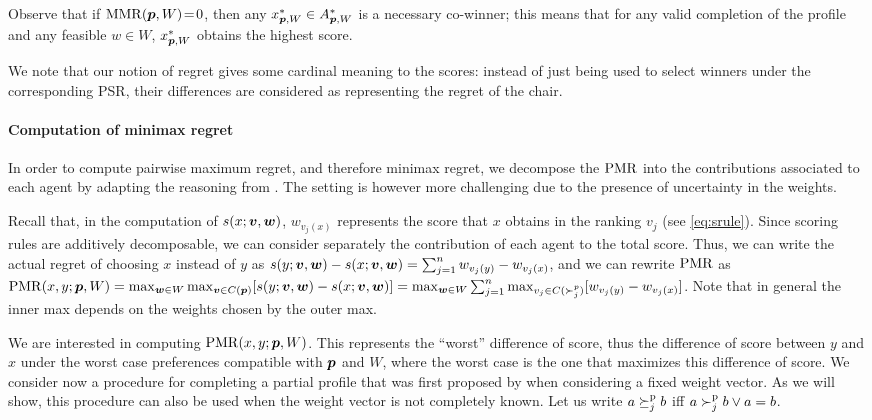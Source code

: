 \documentclass{article}
\begin{document}
Observe that if $\operatorname{MMR}({\bm{p}}, W)\!=\!0$, then any $x^{*}_{{\bm{p}},W} \in A^*_{{\bm{p}}, W}$ is a necessary co-winner; this means that for any valid completion of the profile and any feasible $w \in W$, $x^{*}_{{\bm{p}},W}$ obtains the highest score.

We note that our notion of regret gives some cardinal meaning to the scores: instead of just being used to select winners under the corresponding PSR, their differences are considered as representing the regret of the chair.


\paragraph{Computation of minimax regret}
In order to compute pairwise maximum regret, and therefore minimax regret, we decompose the $\operatorname{PMR}$ into the contributions associated to each agent by adapting the reasoning from \citet{Lu2011}.
The setting is however more challenging due to the presence of uncertainty in the weights.

Recall that, in the computation of $s(x; \bm{v}, \bm{w})$, $w_{v_j(x)}$ represents the score that $x$ obtains in the ranking $v_j$ (see \cref{eq:srule}).
Since scoring rules are additively decomposable, we can consider separately the contribution of each agent to the total score. Thus, we can write the actual regret of choosing $x$ instead of $y$ as $s(y; \bm{v},\bm{w}) - s(x; \bm{v}, \bm{w}) = \sum_{j=1}^n w_{v_j(y)} - w_{v_j(x)}$, and we can rewrite $\operatorname{PMR}$ as $\operatorname{PMR}(x,y; {\bm{p}}, W) = \max_{\bm{w} \in W} \max_{\bm{v} \in C({\bm{p}})} [ s(y; \bm{v},\bm{w}) - s(x; \bm{v},\bm{w}) ] =  \max_{\bm{w} \in W} \sum_{j=1}^{n} \max_{v_j \in C(\succ_j^p)} [w_{v_j(y)} - w_{v_j(x)}]$.
Note that in general the inner max depends on the weights chosen by the outer max.

We are interested in computing $\operatorname{PMR}(x, y; {\bm{p}}, W)$. This represents the “worst” difference of score, thus the difference of score between $y$ and $x$ under the worst case preferences compatible with ${\bm{p}}$ and $W$, where the worst case is the one that maximizes this difference of score.
We consider now a procedure for completing a partial profile that was first proposed by \citet{Lu2011} when considering %
a fixed weight vector.
As we will show, this procedure can also be used when the weight vector is not completely known. Let us write $a \succeq^\text{p}_j b$ iff $a \succ^\text{p}_j b \lor a = b$.
\end{document}
